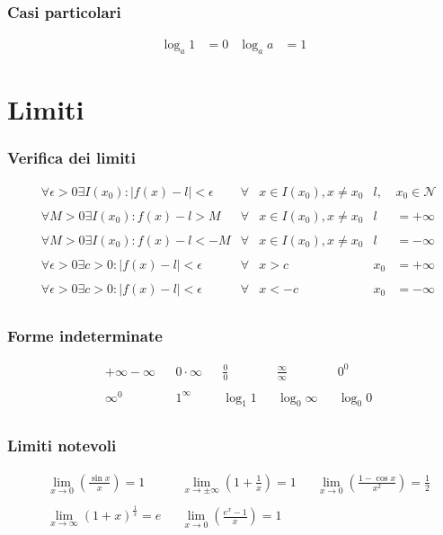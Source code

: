 \documentclass[a4paper]{article}
\begin{document}
	\subsubsection{Casi particolari}
	\begin{align*}
		\log_{a} 1 &= 0 &
		\log_{a} a &= 1
	\end{align*}
		
	\newpage
	\section{Limiti}
	
	\subsubsection{Verifica dei limiti}
	\begin{align*}
		&\forall \epsilon > 0 \exists I(x_0) : \left| f(x) - l \right|<\epsilon	&	\forall &x \in I(x_0),x\ne x_0	&	l,&x_0 \in \mathcal{N}\\\\
		&\forall M > 0 \exists I(x_0) : f(x) - l > M	&	\forall &x \in I(x_0),x\ne x_0	&	l &=+\infty\\\\
		&\forall M > 0 \exists I(x_0) : f(x) - l < -M	&	\forall &x \in I(x_0),x\ne x_0	&	l &=-\infty\\\\
		&\forall \epsilon > 0 \exists c>0: \left| f(x) - l \right| < \epsilon	&	\forall &x>c	&	x_0 &= +\infty\\\\
		&\forall \epsilon > 0 \exists c>0: \left| f(x) - l \right| < \epsilon	&	\forall &x<-c	&	x_0 &= -\infty\\
	\end{align*}
	\subsubsection{Forme indeterminate}
	\begin{align*}
		 & +\infty-\infty &  & 0\cdot \infty &  & \frac{0}{0} &  & \frac{\infty}{\infty} &  & 0^0        \\\\
		 & \infty^0       &  & 1^\infty      &  & \log_{1}1   &  & \log_{0} \infty       &  & \log_{0} 0\\
	\end{align*}
	
	\subsubsection{Limiti notevoli}
	\begin{align*}
		 & \lim\limits_{x \to 0} \left(\frac{\sin x}{x}\right) = 1 &  & \lim\limits_{x \to \pm \infty} \left(1+\frac{1}{x}\right) = 1	&	&\lim\limits_{x \to 0} \left(\frac{1-\cos x}{x^2}\right) = \frac{1}{2}\\\\
		 & \lim\limits_{x \to \infty} (1+x)^{\frac{1}{x}} = e &  & \lim\limits_{x \to 0} \left(\frac{e^x-1}{x}\right) = 1\\
		 \end{align*}
	
\end{document}
